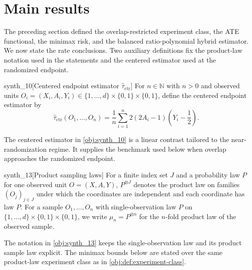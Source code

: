 \section{Main results}

The preceding section defined the overlap-restricted experiment class, the ATE functional, the minimax risk, and the balanced ratio-polynomial hybrid estimator. We now state the rate conclusions. Two auxiliary definitions fix the product-law notation used in the statements and the centered estimator used at the randomized endpoint.

\begin{definitionv}{synth_10}[Centered endpoint estimator $\widehat\tau_{\mathrm{ctr}}$]
For \(n\in\mathbb N\) with \(n>0\) and observed units \(O_i=(X_i,A_i,Y_i)\in\{1,\ldots,d\}\times\{0,1\}\times\{0,1\}\), define the centered endpoint estimator by \[ \widehat\tau_{\mathrm{ctr}}(O_1,\ldots,O_n)=\frac1n\sum_{i=1}^n 2(2A_i-1)\left(Y_i-\frac12\right). \]
\end{definitionv}

The centered estimator in \cref{obj:synth_10} is a linear contrast tailored to the near-randomization regime. It supplies the benchmark used below when overlap approaches the randomized endpoint.

\begin{definitionv}{synth_13}[Product sampling laws]
For a finite index set \(J\) and a probability law \(P\) for one observed unit \(O=(X,A,Y)\), \(P^{\otimes J}\) denotes the product law on families \((O_j)_{j\in J}\) under which the coordinates are independent and each coordinate has law \(P\). For a sample \(O_1,\ldots,O_n\) with single-observation law \(P\) on \(\{1,\ldots,d\}\times\{0,1\}\times\{0,1\}\), we write \(\mu_n=P^{\otimes n}\) for the \(n\)-fold product law of the observed sample.
\end{definitionv}

The notation in \cref{obj:synth_13} keeps the single-observation law and its product sample law explicit. The minimax bounds below are stated over the same product-law experiment class as in \cref{obj:def:experiment-class}.

